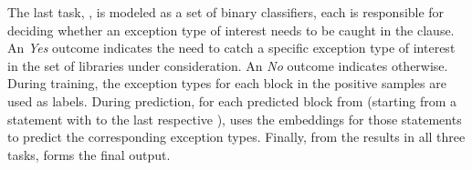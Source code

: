 The last task, {\xtype}, is modeled as a set of binary classifiers,
each is responsible for deciding whether an exception type of interest
needs to be caught in the  clause. An {\em Yes} outcome
indicates the need to catch a specific exception type of interest in
the set of libraries under consideration. An {\em No} outcome indicates
otherwise.  During training, the exception types for each
 block in the positive samples are used as
labels. During prediction, for each predicted block from {\xstate}
(starting from a statement with  to the last respective
), {\xtype} uses the embeddings for those statements to
predict the corresponding exception types. Finally, from the results
in all three tasks, {\tool} forms the final output.



